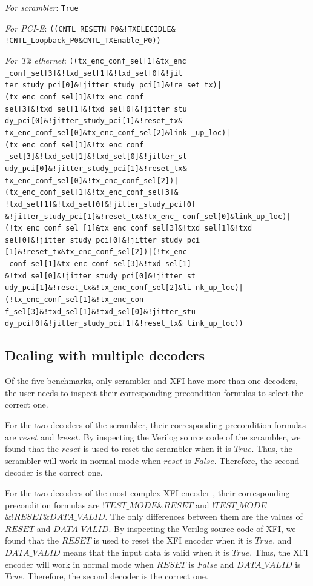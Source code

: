 \documentclass[journal]{IEEEtran}
\begin{document}
\emph{For scrambler}:
\texttt{True}

\emph{For PCI-E}:
\texttt{((CNTL\_RESETN\_P0\&!TXELECIDLE\&
!CNTL\_Loopback\_P0\&CNTL\_TXEnable\_P0))}

\emph{For T2 ethernet}:
\texttt{((tx\_enc\_conf\_sel[1]\&tx\_enc
\_conf\_sel[3]\&!txd\_sel[1]\&!txd\_sel[0]\&!jit
ter\_study\_pci[0]\&!jitter\_study\_pci[1]\&!re
set\_tx)|(tx\_enc\_conf\_sel[1]\&!tx\_enc\_conf\_
sel[3]\&!txd\_sel[1]\&!txd\_sel[0]\&!jitter\_stu
dy\_pci[0]\&!jitter\_study\_pci[1]\&!reset\_tx\&
tx\_enc\_conf\_sel[0]\&tx\_enc\_conf\_sel[2]\&link
\_up\_loc)|(tx\_enc\_conf\_sel[1]\&!tx\_enc\_conf
\_sel[3]\&!txd\_sel[1]\&!txd\_sel[0]\&!jitter\_st
udy\_pci[0]\&!jitter\_study\_pci[1]\&!reset\_tx\&
tx\_enc\_conf\_sel[0]\&!tx\_enc\_conf\_sel[2])|
(tx\_enc\_conf\_sel[1]\&!tx\_enc\_conf\_sel[3]\&
!txd\_sel[1]\&!txd\_sel[0]\&!jitter\_study\_pci[0]
\&!jitter\_study\_pci[1]\&!reset\_tx\&!tx\_enc\_
conf\_sel[0]\&link\_up\_loc)|(!tx\_enc\_conf\_sel
[1]\&tx\_enc\_conf\_sel[3]\&!txd\_sel[1]\&!txd\_
sel[0]\&!jitter\_study\_pci[0]\&!jitter\_study\_pci
[1]\&!reset\_tx\&tx\_enc\_conf\_sel[2])|(!tx\_enc
\_conf\_sel[1]\&tx\_enc\_conf\_sel[3]\&!txd\_sel[1]
\&!txd\_sel[0]\&!jitter\_study\_pci[0]\&!jitter\_st
udy\_pci[1]\&!reset\_tx\&!tx\_enc\_conf\_sel[2]\&li
nk\_up\_loc)|(!tx\_enc\_conf\_sel[1]\&!tx\_enc\_con
f\_sel[3]\&!txd\_sel[1]\&!txd\_sel[0]\&!jitter\_stu
dy\_pci[0]\&!jitter\_study\_pci[1]\&!reset\_tx\&
link\_up\_loc))}


\subsection{Dealing with multiple decoders}\label{subsec_exp_muldec}
Of the five benchmarks,
only scrambler and XFI have more than one decoders,
the user needs to inspect their corresponding precondition formulas to select the correct one.

For the two decoders of the scrambler,
their corresponding precondition formulas are $reset$ and $!reset$.
By inspecting the Verilog source code of the scrambler,
we found that the $reset$ is used to reset the scrambler when it is $True$.
Thus,
the scrambler will work in normal mode when $reset$ is $False$.
Therefore,
the second decoder is the correct one.

For the two decoders of the most complex XFI encoder \cite{IEEE80232002},
their corresponding precondition formulas are $!TEST\_MODE \& RESET$ and $!TEST\_MODE$ $\& !RESET \& DATA\_VALID$.
The only differences between them are the values of $RESET$ and $DATA\_VALID$.
By inspecting the Verilog source code of XFI,
we found that the $RESET$ is used to reset the XFI encoder when it is $True$,
and $DATA\_VALID$ means that the input data is valid when it is $True$.
Thus,
the XFI encoder will work in normal mode when $RESET$ is $False$ and $DATA\_VALID$ is $True$.
Therefore,
the second decoder is the correct one.
\end{document}
